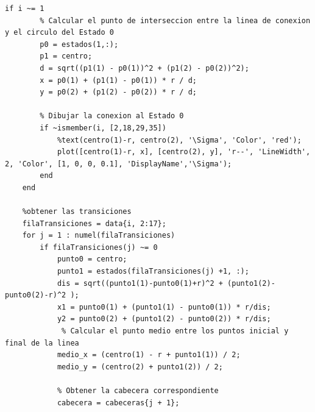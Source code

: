 \documentclass{article}
\begin{document}
\begin{lstlisting}[caption={Archivo: \textit{GraficoAutomataP04} | Script}, style=matlabstyle, basicstyle=\ttfamily\footnotesize]
    if i ~= 1
        % Calcular el punto de interseccion entre la linea de conexion y el circulo del Estado 0
        p0 = estados(1,:);
        p1 = centro;
        d = sqrt((p1(1) - p0(1))^2 + (p1(2) - p0(2))^2);
        x = p0(1) + (p1(1) - p0(1)) * r / d;
        y = p0(2) + (p1(2) - p0(2)) * r / d;

        % Dibujar la conexion al Estado 0
        if ~ismember(i, [2,18,29,35])
            %text(centro(1)-r, centro(2), '\Sigma', 'Color', 'red');
            plot([centro(1)-r, x], [centro(2), y], 'r--', 'LineWidth', 2, 'Color', [1, 0, 0, 0.1], 'DisplayName','\Sigma');
        end
    end

    %obtener las transiciones
    filaTransiciones = data{i, 2:17};
    for j = 1 : numel(filaTransiciones)
        if filaTransiciones(j) ~= 0
            punto0 = centro;
            punto1 = estados(filaTransiciones(j) +1, :);
            dis = sqrt((punto1(1)-punto0(1)+r)^2 + (punto1(2)-punto0(2)-r)^2 );
            x1 = punto0(1) + (punto1(1) - punto0(1)) * r/dis;
            y2 = punto0(2) + (punto1(2) - punto0(2)) * r/dis;
             % Calcular el punto medio entre los puntos inicial y final de la linea
            medio_x = (centro(1) - r + punto1(1)) / 2;
            medio_y = (centro(2) + punto1(2)) / 2;

            % Obtener la cabecera correspondiente
            cabecera = cabeceras{j + 1};


\end{lstlisting}
\end{document}
